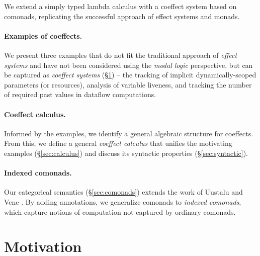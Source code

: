 We extend a simply typed lambda calculus with a coeffect system based on comonads,
replicating the successful approach of effect systems and monads.

\paragraph{Examples of coeffects.}
We present three examples that do not fit the traditional approach of
\emph{effect systems} and have not been considered using the \emph{modal logic}
perspective, but can be captured as \emph{coeffect systems} (\S\ref{sec:motivation}) --
the tracking of implicit dynamically-scoped parameters (or resources),
analysis of variable liveness, and tracking the
number of required past values in dataflow computations.

\paragraph{Coeffect calculus.}
Informed by the examples, we identify a general algebraic structure for coeffects. 
From this, we define a general \emph{coeffect calculus} that unifies the motivating 
examples (\S\ref{sec:calculus}) and discuss its syntactic properties (\S\ref{sec:syntactic}). 

\paragraph{Indexed comonads.}
Our categorical semantics (\S\ref{sec:comonads}) extends the work of Uustalu and Vene 
\cite{comonads-notions}. By adding annotations, we generalize comonads to \emph{indexed comonads}, 
which capture notions of computation not captured by ordinary comonads.


\section{Motivation}
\label{sec:motivation}

